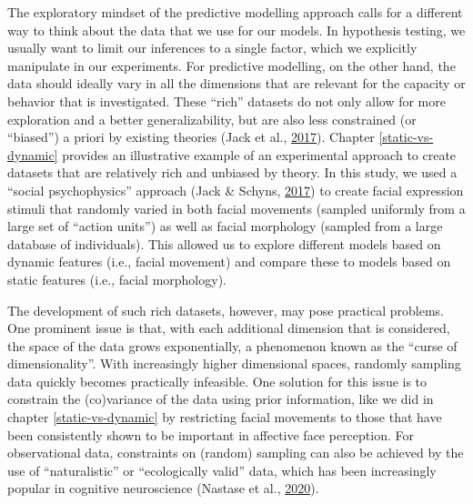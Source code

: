\documentclass[11pt,american,a4paper,oneside,]{memoir} %
\begin{document}
The exploratory mindset of the predictive modelling approach calls for a different way to think about the data that we use for our models. In hypothesis testing, we usually want to limit our inferences to a single factor, which we explicitly manipulate in our experiments. For predictive modelling, on the other hand, the data should ideally vary in all the dimensions that are relevant for the capacity or behavior that is investigated. These ``rich'' datasets do not only allow for more exploration and a better generalizability, but are also less constrained (or ``biased'') a priori by existing theories (Jack et al., \protect\hyperlink{ref-Jack2017-qp}{2017}). Chapter \ref{static-vs-dynamic} provides an illustrative example of an experimental approach to create datasets that are relatively rich and unbiased by theory. In this study, we used a ``social psychophysics'' approach (Jack \& Schyns, \protect\hyperlink{ref-Jack2017-gt}{2017}) to create facial expression stimuli that randomly varied in both facial movements (sampled uniformly from a large set of ``action units'') as well as facial morphology (sampled from a large database of individuals). This allowed us to explore different models based on dynamic features (i.e., facial movement) and compare these to models based on static features (i.e., facial morphology).

The development of such rich datasets, however, may pose practical problems. One prominent issue is that, with each additional dimension that is considered, the space of the data grows exponentially, a phenomenon known as the ``curse of dimensionality''. With increasingly higher dimensional spaces, randomly sampling data quickly becomes practically infeasible. One solution for this issue is to constrain the (co)variance of the data using prior information, like we did in chapter \ref{static-vs-dynamic} by restricting facial movements to those that have been consistently shown to be important in affective face perception. For observational data, constraints on (random) sampling can also be achieved by the use of ``naturalistic'' or ``ecologically valid'' data, which has been increasingly popular in cognitive neuroscience (Nastase et al., \protect\hyperlink{ref-Nastase2020-he}{2020}).
\end{document}
